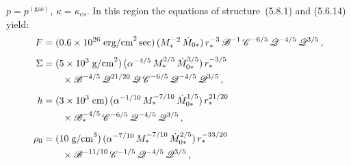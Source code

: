 $p = p^{(\text{gas})}$, $\kappa = \kappa_{es}$.  In this region the equations of structure~(5.8.1) and (5.6.14)
yield:
%
\begin{align}
F &= (0.6 \times 10^{26}\;\text{erg/cm}^2\,\text{sec})\,
    (M_*^{-2}\,\dot{M}_{0*})\,
    r_*^{-3}\,\mathscr{B}^{-1}\,\mathscr{C}^{-6/5}\,\mathscr{Q}^{-4/5}\,\mathscr{Q}^{3/5}\,, \notag \\[4pt]
%
\Sigma &= (5 \times 10^{3}\;\text{g/cm}^2)\,
    (\alpha^{-4/5}\,M_*^{2/5}\,\dot{M}_{0*}^{3/5})\,
    r_*^{-3/5}\notag \\
  &\qquad \times \mathscr{B}^{-4/5}\,\mathscr{Q}^{21/20}\,\mathscr{Q}\,
    \mathscr{C}^{-6/5}\,\mathscr{Q}^{-4/5}\,\mathscr{Q}^{3/5}\,, \notag \\[4pt]
%
h &= (3 \times 10^{3}\;\text{cm})\,
    (\alpha^{-1/10}\,M_*^{-7/10}\,\dot{M}_{0*}^{1/5})\,
    r_*^{21/20}\notag \\
  &\qquad \times \mathscr{B}_*^{-4/5}\,\mathscr{C}^{-6/5}\,
    \mathscr{Q}^{-4/5}\,\mathscr{Q}^{3/5}\,, \notag \\[4pt]
%
\rho_0 &= (10\;\text{g/cm}^3)\,
    (\alpha^{-7/10}\,M_*^{-7/10}\,\dot{M}_{0*}^{2/5})\,
    r_*^{-33/20} \notag \\
  &\qquad \times \mathscr{B}^{-11/10}\,
    \mathscr{C}^{-1/5}\,\mathscr{Q}^{-4/5}\,\mathscr{Q}^{3/5}\,, \notag
\end{align}
%
